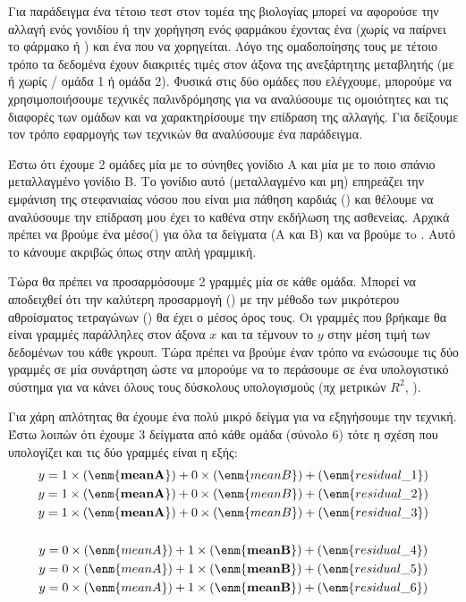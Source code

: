 Για παράδειγμα ένα τέτοιο τεστ στον τομέα της
βιολογίας μπορεί να αφορούσε την αλλαγή ενός γονιδίου ή την χορήγηση ενός φαρμάκου
έχοντας ένα  (χωρίς να παίρνει το φάρμακο ή ) και ένα που να
χορηγείται. Λόγο της ομαδοποίησης τους με τέτοιο τρόπο τα δεδομένα έχουν διακριτές τιμές
στον άξονα της ανεξάρτητης μεταβλητής (με ή χωρίς / ομάδα 1 ή ομάδα 2). Φυσικά στις δύο
ομάδες που ελέγχουμε, μπορούμε να χρησιμοποιήσουμε τεχνικές παλινδρόμησης για να
αναλύσουμε τις ομοιότητες και τις διαφορές των ομάδων και να χαρακτηρίσουμε την
επίδραση της αλλαγής. Για δείξουμε τον τρόπο εφαρμογής των τεχνικών θα αναλύσουμε ένα
παράδειγμα.

Έστω ότι έχουμε 2 ομάδες μία με το σύνηθες γονίδιο Α και μία με το ποιο σπάνιο
μεταλλαγμένο γονίδιο Β. Το γονίδιο αυτό (μεταλλαγμένο και μη) επηρεάζει την
εμφάνιση της στεφανιαίας νόσου που είναι μια πάθηση καρδιάς () και θέλουμε
να αναλύσουμε την επίδραση μου έχει το καθένα στην εκδήλωση της ασθενείας. Αρχικά
πρέπει να βρούμε ένα μέσο() για όλα τα δείγματα (Α και Β) και να βρούμε τo .
Αυτό το κάνουμε ακριβώς όπως στην απλή γραμμική.

Τώρα θα πρέπει να προσαρμόσουμε 2
γραμμές μία σε κάθε ομάδα. Μπορεί να αποδειχθεί ότι την καλύτερη προσαρμογή ()
με την μέθοδο των μικρότερου αθροίσματος τετραγώνων () θα έχει ο μέσος
όρος τους. Οι γραμμές που βρήκαμε θα είναι γραμμές παράλληλες στον άξονα $x$ και τα
τέμνουν το $y$ στην μέση τιμή των δεδομένων του κάθε γκρουπ. Τώρα πρέπει να βρούμε έναν
τρόπο να ενώσουμε τις δύο γραμμές σε μία συνάρτηση ώστε να μπορούμε να το περάσουμε
σε ένα υπολογιστικό σύστημα για να κάνει όλους τους δύσκολους υπολογισμούς (πχ
μετρικών $R^2$, ).

Για χάρη απλότητας θα έχουμε ένα πολύ μικρό δείγμα για να
εξηγήσουμε την τεχνική.
Έστω λοιπών ότι έχουμε 3 δείγματα από κάθε ομάδα (σύνολο 6) τότε η σχέση που υπολογίζει
και τις δύο γραμμές είναι η εξής:
\begin{gather*}
    y=1\times (\enm{\textbf{meanA}}) + 0\times (\enm{meanB}) + (\enm{residual\_1})\\
    y=1\times (\enm{\textbf{meanA}}) + 0\times (\enm{meanB}) + (\enm{residual\_2})\\
    y=1\times (\enm{\textbf{meanA}}) + 0\times (\enm{meanB}) + (\enm{residual\_3})\\
    \\
    y=0\times (\enm{meanA}) + 1\times (\enm{\textbf{meanB}}) + (\enm{residual\_4})\\
    y=0\times (\enm{meanA}) + 1\times (\enm{\textbf{meanB}}) + (\enm{residual\_5})\\
    y=0\times (\enm{meanA}) + 1\times (\enm{\textbf{meanB}}) + (\enm{residual\_6})
\end{gather*}

